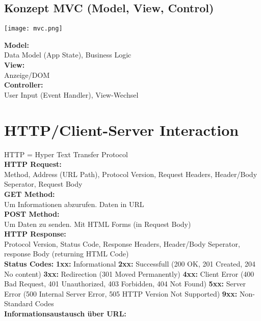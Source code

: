 \documentclass[7pt,landscape,a4paper]{scrartcl}
\begin{document}
\begin{multicols*}{4}
\subsection{Konzept MVC (Model, View, Control)}
\begin{minipage}{0.48\linewidth}
	\texttt{[image: mvc.png]}
\end{minipage}
\begin{minipage}{0.48\linewidth}
	\textbf{Model:}\\
	Data Model (App State), Business Logic\\
	\textbf{View:}\\
	Anzeige/DOM\\
	\textbf{Controller:}\\
	User Input (Event Handler), View-Wechsel
\end{minipage}
\section{HTTP/Client-Server Interaction}
	HTTP = Hyper Text Transfer Protocol\\
	\textcolor{b}{\textbf{HTTP Request:}}\\
	Method, Address (URL Path), Protocol Version, Request Headers, Header/Body Seperator, Request Body\\
	\textcolor{b}{\textbf{GET Method:}}\\
	Um Informationen abzurufen. Daten in URL\\
	\textcolor{b}{\textbf{POST Method:}}\\
	Um Daten zu senden. Mit HTML Forms (in Request Body)\\
	\textcolor{b}{\textbf{HTTP Response:}}\\
	Protocol Version, Status Code, Response Headers, Header/Body Seperator, response Body (returning HTML Code)\\
	\textcolor{b}{\textbf{Status Codes:}} \textbf{1xx:} Informational \textbf{2xx:} Successfull (\textcolor{b}{200} OK, \textcolor{b}{201} Created, \textcolor{b}{204} No content) \textbf{3xx:} Redirection (\textcolor{b}{301} Moved Permanently) \textbf{4xx:} Client Error (\textcolor{b}{400} Bad Request, \textcolor{b}{401} Unauthorized, \textcolor{b}{403} Forbidden, \textcolor{b}{404} Not Found) \textbf{5xx:} Server Error (\textcolor{b}{500} Internal Server Error, \textcolor{b}{505} HTTP Version Not Supported) \textbf{9xx:} Non-Standard Codes\\
	\textcolor{b}{\textbf{Informationsaustausch über URL:}}\\

\end{multicols*}
\end{document}
